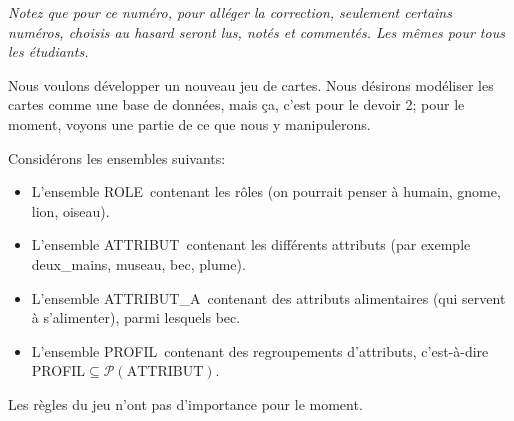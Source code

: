 \documentclass[12pt]{article}
\newcounter{exercice}\newcommand{\exercice}{\bigskip \addtocounter{exercice}{1}\noindent \textbf{Exercice \theexercice}\\}
\begin{document}
\newpage
\exercice
\emph{Notez que pour ce numéro, pour alléger la correction, seulement certains numéros, choisis au hasard seront lus, notés et commentés. Les mêmes pour tous les étudiants.}

Nous voulons développer un nouveau jeu de cartes. Nous désirons modéliser les cartes comme une base de données, mais ça, c'est pour le devoir 2; pour le moment, voyons une partie de ce que nous y manipulerons.
\newcommand{\role}{\mbox{ROLE}}
\newcommand{\attribut}{\mbox{ATTRIBUT}}
\newcommand{\attributn}{\mbox{ATTRIBUT\_A}}
\newcommand{\profil}{\mbox{PROFIL}}

Considérons les ensembles suivants:
\begin{itemize}
\item L'ensemble \role\ contenant les rôles (on pourrait penser à \textsf{humain},  \textsf{gnome}, \textsf{lion}, \textsf{oiseau}).
\item L'ensemble \attribut\ contenant les différents attributs (par exemple \textsf{deux\_mains},  \textsf{museau}, \textsf{bec}, \textsf{plume}).
\item L'ensemble \attributn\ contenant des attributs alimentaires (qui servent à s'alimenter), parmi lesquels \textsf{bec}.
\item L'ensemble \profil\ contenant des regroupements d'attributs, c'est-à-dire \profil$\subseteq \mathcal{P}(\attribut)$.
\end{itemize}
\noindent
Les règles du jeu n'ont pas d'importance pour le moment. 
\end{document}
